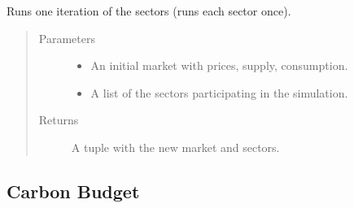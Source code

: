 \documentclass[letterpaper,10pt,english]{sphinxmanual}
\begin{document}
\begin{fulllineitems}
\label{\detokenize{api:muse.mca.single_year_iteration}}
Runs one iteration of the sectors (runs each sector once).
\begin{quote}\begin{description}
\item[{Parameters}] \leavevmode\begin{itemize}
\item {} 
 \textendash{} An initial market with prices, supply, consumption.

\item {} 
 \textendash{} A list of the sectors participating in the simulation.

\end{itemize}

\item[{Returns}] \leavevmode
A tuple with the new market and sectors.

\end{description}\end{quote}

\end{fulllineitems}



\subsection{Carbon Budget}
\label{\detokenize{api:module-muse.carbon_budget}}\label{\detokenize{api:carbon-budget}}
\end{document}
